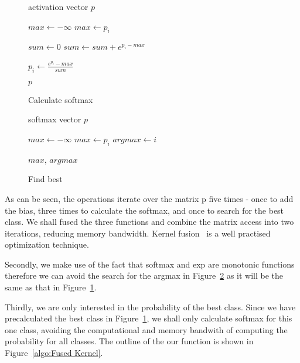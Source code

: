 \documentclass[]{article}
\begin{document}
\begin{figure} [h]
\begin{algorithmic}
\REQUIRE activation vector $p$


\STATE $max \gets - \infty$ 
    \STATE $max \gets p_i$
  \ENDIF
\ENDFOR 


\STATE $sum \gets 0$ 
  \STATE $sum \gets sum + e^{p_i - max}$
\ENDFOR 


  \STATE $p_i \gets \frac{e^{p_i} - max}{sum} $
\ENDFOR 

\RETURN $p$

\end{algorithmic}
\caption{Calculate softmax}
\label{algo:Calculate softmax}
\end{figure}

\begin{figure} [h]
\begin{algorithmic}
\REQUIRE softmax vector $p$

\STATE $max \gets - \infty$ 
    \STATE $max \gets p_i$
    \STATE $argmax \gets i$
  \ENDIF
\ENDFOR 

\RETURN $max$, $argmax$

\end{algorithmic}
\caption{Find best}
\label{algo:Find best}
\end{figure}


As can be seen, the operations iterate over the matrix p five times - once to add the bias, three times to calculate the softmax, and once to search for the best class. We shall fused the three functions and combine the matrix access into two iterations, reducing memory bandwidth. Kernel fusion~\citep{Guevara2009EnablingTP} is a well practised optimization technique.

Secondly, we make use of the fact that softmax and exp are monotonic functions therefore we can avoid the search for the argmax in Figure~\ref{algo:Find best} as it will be the same as that in Figure~\ref{algo:Calculate softmax}.

Thirdly, we are only interested in the probability of the best class. Since we have precalculated the best class in Figure~\ref{algo:Calculate softmax}, we shall only calculate softmax for this one class, avoiding the computational and memory bandwith of computing the probability for all classes. The outline of the our function is shown in Figure~\ref{algo:Fused Kernel}.
\end{document}
